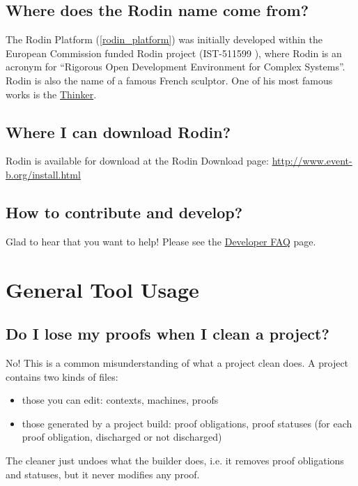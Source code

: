 \subsection{Where does the Rodin name come from?}

The Rodin Platform (\ref{rodin_platform}) was initially developed within the European Commission funded Rodin project (IST-511599 ), where Rodin is an acronym for ``Rigorous Open Development Environment for Complex Systems”. Rodin is also the name of a famous French sculptor. One of his most famous works is the \href{http://en.wikipedia.org/wiki/The_Thinker}{Thinker}. 

\subsection{Where I can download Rodin?}
\label{faq_where_download_rodin}

Rodin is available for download at the Rodin Download page: \href{http://www.event-b.org/install.html}{http://www.event-b.org/install.html}

\subsection{How to contribute and develop?}

Glad to hear that you want to help!  Please see the \href{http://wiki.event-b.org/index.php/Developer_FAQ}{Developer FAQ} page.

\section{General Tool Usage}

\subsection{Do I lose my proofs when I clean a project?}
No! This is a common misunderstanding of what a project clean does. A project contains two kinds of files: 

\begin{itemize}
	\item those you can edit: contexts, machines, proofs 
	\item those generated by a project build: proof obligations, proof statuses (for each proof obligation, discharged or not discharged) 
\end{itemize}

The cleaner just undoes what the builder does, i.e. it removes proof obligations and statuses, but it never modifies any proof.

